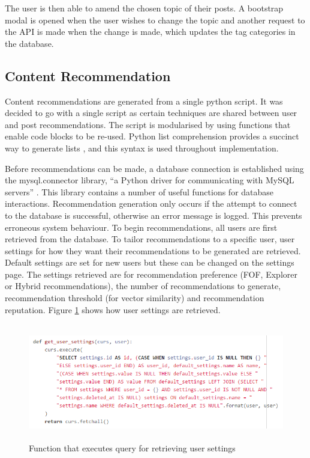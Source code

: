 The user is then able to amend the chosen topic of their posts. A bootstrap modal is opened when the user wishes to change the topic and another request to the API is made when the change is made, which updates the tag categories in the database.

\subsection{Content Recommendation}
Content recommendations are generated from a single python script. It was decided to go with a single script as certain techniques are shared between user and post recommendations. The script is modularised by using functions that enable code blocks to be re-used. Python list comprehension provides a succinct way to generate lists \cite{Python:ListComprehension}, and this syntax is used throughout implementation.

Before recommendations can be made, a database connection is established using the mysql.connector library, ``a Python driver for communicating with MySQL servers'' \cite{MySQL:MySQLConnector}. This library contains a number of useful functions for database interactions. Recommendation generation only occurs if the attempt to connect to the database is successful, otherwise an error message is logged. This prevents erroneous system behaviour. To begin recommendations, all users are first retrieved from the database. To tailor recommendations to a specific user, user settings for how they want their recommendations to be generated are retrieved. Default settings are set for new users but these can be changed on the settings page. The settings retrieved are for recommendation preference (FOF, Explorer or Hybrid recommendations), the number of recommendations to generate, recommendation threshold (for vector similarity) and recommendation reputation. Figure \ref{fig:RecommendationSettings} shows how user settings are retrieved.


\begin{figure}[H]
\centering
\includegraphics[height=2in]{Images/Implementation/RecommendationSettings}
\caption{Function that executes query for retrieving user settings}
\label{fig:RecommendationSettings}
\end{figure}

